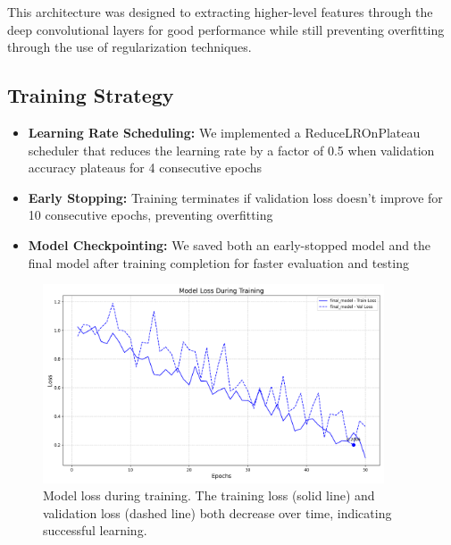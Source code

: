 \documentclass[10pt]{article}
\begin{document}
This architecture was designed to extracting higher-level features through the deep convolutional layers for good performance while still preventing overfitting through the use of regularization techniques.

\subsection{Training Strategy}

\begin{itemize}
    \item \textbf{Learning Rate Scheduling:} We implemented a ReduceLROnPlateau scheduler that reduces the learning rate by a factor of 0.5 when validation accuracy plateaus for 4 consecutive epochs
    
    \item \textbf{Early Stopping:} Training terminates if validation loss doesn't improve for 10 consecutive epochs, preventing overfitting
    
    \item \textbf{Model Checkpointing:} We saved both an early-stopped model and the final model after training completion for faster evaluation and testing
\end{itemize}

\begin{figure}[H]
    \centering
    \includegraphics[width=0.9\textwidth]{figures/loss_curves.png}
    \caption{Model loss during training. The training loss (solid line) and validation loss (dashed line) both decrease over time, indicating successful learning.}
    \label{fig:model_loss}
\end{figure}
\end{document}
